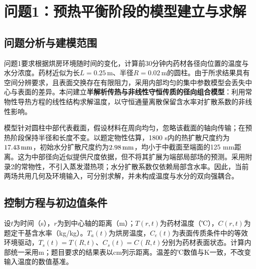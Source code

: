 
\section{问题1：预热平衡阶段的模型建立与求解}
\label{sec:q1}

\subsection{问题分析与建模范围}

问题1要求根据烘房环境随时间的变化，计算前30分钟内药材各径向位置的温度与水分浓度。药材近似为长$L=0.25\,\mathrm{m}$、半径$R=0.02\,\mathrm{m}$的圆柱。由于所求结果具有空间分辨要求，且表面交换存在有限阻力，采用内部均匀的集中参数模型会丢失中心与表面的差异。本问建立\textbf{半解析传热与非线性守恒传质的径向组合模型}：利用常物性导热方程的线性结构求解温度，以守恒通量离散保留含水率对扩散系数的非线性影响。

模型针对圆柱中部代表截面，假设材料在周向均匀，忽略该截面的轴向传输；在预热阶段保持半径和长度不变。以题定物性估算，1800 s内的热扩散尺度约为$17.43\,\mathrm{mm}$，初始水分扩散尺度约为$2.98\,\mathrm{mm}$，均小于中截面至端面的125 mm距离。这为中部径向近似提供尺度依据，但不将其扩展为端部局部场的预测。采用附录2的常物性，不引入蒸发潜热项；水分扩散系数仅依赖局部含水率。因此，当前两场共用几何及环境输入，可分别求解，并未构成温度与水分的双向强耦合。

\subsection{控制方程与初边值条件}

设$t$为时间（s），$r$为到中心轴的距离（m）；$T(r,t)$为药材温度（℃），$C(r,t)$为题定干基含水率（kg/kg）。$T_a(t)$为烘房温度，$C_e(t)$为表面传质条件中的等效环境驱动，$T_s(t)=T(R,t)$、$C_s(t)=C(R,t)$分别为药材表面状态。计算内部统一采用m；题目要求的结果表以cm列示距离。温差的℃数值与K一致，不改变输入温度的数值基准。

